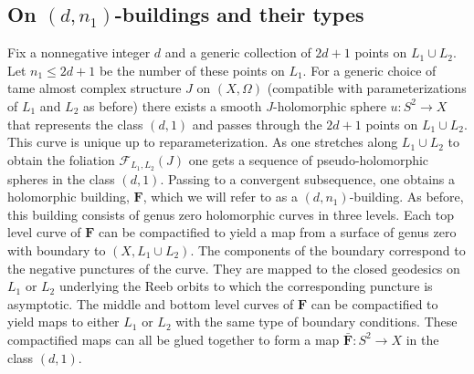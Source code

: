 \documentclass[12pt]{amsart}
\theoremstyle{definition}
\begin{document}
\subsection{On $(d,n_1)$-buildings and their types}\label{sub:d}
Fix a nonnegative integer $d$ and a generic collection of $2d+1$ points on $L_1 \cup L_2$. Let $n_1 \le 2d+1$ be the number of these points on $L_1$. For a generic choice of tame almost complex structure $J$ on $(X,\Omega)$ (compatible with parameterizations of $L_1$ and $L_2$ as before) there exists a smooth $J$-holomorphic sphere $u\colon S^2 \to X$ that represents the class $(d,1)$ and passes through the $2d+1$ points on $L_1 \cup L_2$. This curve is unique up to reparameterization. 
As one  stretches along  $L_1 \cup L_2$ to obtain the foliation $\mathcal{F}_{L_1,L_2}(J)$ one gets a sequence of pseudo-holomorphic spheres in the class $(d,1)$. Passing to a convergent subsequence, one obtains a holomorphic building, $\mathbf{F}$, which we will refer to as a $(d,n_1)$-building. As before, this building consists of genus zero holomorphic curves in three levels.
Each top level curve of $\mathbf{F}$ can be compactified to yield a map from a surface of genus zero with boundary to $(X,L_1 \cup L_2)$. The components of the boundary correspond to the negative punctures of the curve.  They are mapped to the closed geodesics on $L_1$  or $L_2$ underlying the Reeb orbits to which the corresponding puncture is asymptotic. The middle and bottom level curves of $\mathbf{F}$ can be compactified to yield maps to either $L_1$ or $L_2$ with the same type of boundary conditions. These compactified maps can all be glued
together to form a map $\bar{\mathbf{F}}\colon S^2  \to X$ in the class $(d,1)$. %
\end{document}
